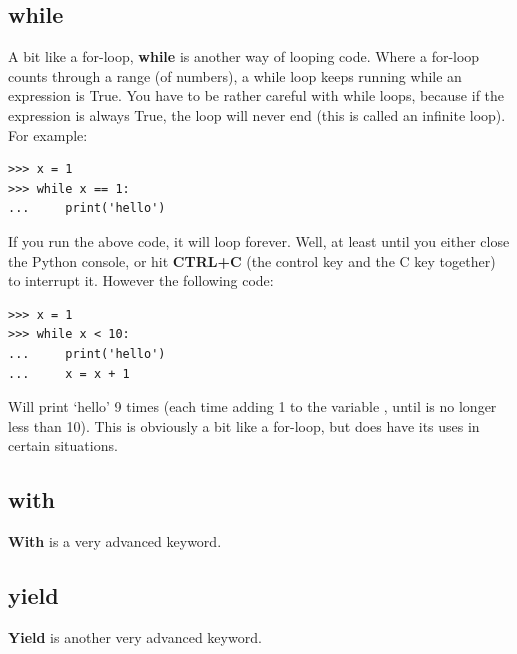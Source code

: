 \subsection*{while}

A bit like a for-loop, \textbf{while} is another way of looping code.  Where a for-loop counts through a range (of numbers), a while loop keeps running while an expression is True.  You have to be rather careful with while loops, because if the expression is always True, the loop will never end (this is called an infinite loop).  For example:

\begin{listingignore}
\begin{verbatim}
>>> x = 1
>>> while x == 1:
...     print('hello')
\end{verbatim}
\end{listingignore}

If you run the above code, it will loop forever.  Well, at least until you either close the Python console, or hit \textbf{CTRL+C} (the control key and the C key together) to interrupt it. However the following code:

\begin{listing}
\begin{verbatim}
>>> x = 1
>>> while x < 10:
...     print('hello')
...     x = x + 1
\end{verbatim}
\end{listing}

Will print `hello' 9 times (each time adding 1 to the variable , until  is no longer less than 10). This is obviously a bit like a for-loop, but does have its uses in certain situations.

\subsection*{with}

\textbf{With} is a very advanced keyword.

\subsection*{yield}
\textbf{Yield} is another very advanced keyword.

\newpage